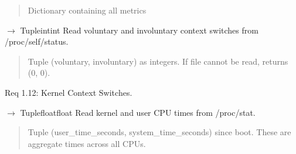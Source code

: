 \documentclass[letterpaper,10pt,english]{sphinxmanual}
\begin{document}
\begin{fulllineitems}
\begin{fulllineitems}
\begin{quote}
\begin{description}
\sphinxAtStartPar
Dictionary containing all metrics

\end{description}\end{quote}

\end{fulllineitems}


\begin{fulllineitems}
\label{\detokenize{core.readers.scheduler_monitor:core.readers.scheduler_monitor.SchedulerMonitor.read_context_switches}}
\pysigstartsignatures
\pysiglinewithargsret
{}
{}
{{ $\rightarrow$ Tuple\DUrole{p}{{[}}intint\DUrole{p}{{]}}}}
\pysigstopsignatures
\sphinxAtStartPar
Read voluntary and involuntary context switches from /proc/self/status.
\begin{quote}\begin{description}
\sphinxAtStartPar
Tuple (voluntary, involuntary) as integers.
If file cannot be read, returns (0, 0).

\end{description}\end{quote}

\sphinxAtStartPar
Req 1.12: Kernel Context Switches.

\end{fulllineitems}


\begin{fulllineitems}
\label{\detokenize{core.readers.scheduler_monitor:core.readers.scheduler_monitor.SchedulerMonitor.read_cpu_times}}
\pysigstartsignatures
\pysiglinewithargsret
{}
{}
{{ $\rightarrow$ Tuple\DUrole{p}{{[}}floatfloat\DUrole{p}{{]}}}}
\pysigstopsignatures
\sphinxAtStartPar
Read kernel and user CPU times from /proc/stat.
\begin{quote}\begin{description}
\sphinxAtStartPar
Tuple (user\_time\_seconds, system\_time\_seconds) since boot.
These are aggregate times across all CPUs.


\end{description}
\end{quote}
\end{fulllineitems}
\end{fulllineitems}
\end{document}
